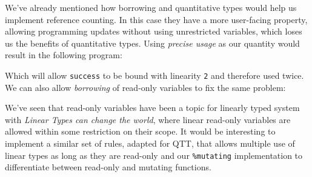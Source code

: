 \documentclass[
]{article}
\newenvironment{Shaded}{}{}
\newcommand{\CommentTok}[1]{\textcolor[rgb]{0.38,0.63,0.69}{\textit{#1}}}
\newcommand{\DataTypeTok}[1]{\textcolor[rgb]{0.56,0.13,0.00}{#1}}
\newcommand{\DecValTok}[1]{\textcolor[rgb]{0.25,0.63,0.44}{#1}}
\newcommand{\FunctionTok}[1]{\textcolor[rgb]{0.02,0.16,0.49}{#1}}
\newcommand{\KeywordTok}[1]{\textcolor[rgb]{0.00,0.44,0.13}{\textbf{#1}}}
\newcommand{\NormalTok}[1]{#1}
\newcommand{\OperatorTok}[1]{\textcolor[rgb]{0.40,0.40,0.40}{#1}}
\newcommand{\OtherTok}[1]{\textcolor[rgb]{0.00,0.44,0.13}{#1}}
\newcommand{\StringTok}[1]{\textcolor[rgb]{0.25,0.44,0.63}{#1}}
\begin{document}
We've already mentioned how borrowing and quantitative types would help
us implement reference counting. In this case they have a more
user-facing property, allowing programming updates without using
unrestricted variables, which loses us the benefits of quantitative
types. Using \emph{precise usage} as our quantity would result in the
following program:

\begin{Shaded}
\end{Shaded}

Which will allow \texttt{success} to be bound with linearity \texttt{2}
and therefore used twice. We can also allow \emph{borrowing} of
read-only variables to fix the same problem:

\begin{Shaded}
\end{Shaded}

We've seen that read-only variables have been a topic for linearly typed
system with \emph{Linear Types can change the
world}\cite{linear_types_update}, where linear read-only variables are
allowed within some restriction on their scope. It would be interesting
to implement a similar set of rules, adapted for QTT, that allows
multiple use of linear types as long as they are read-only and our
\texttt{\%mutating} implementation to differentiate between read-only
and mutating functions.
\end{document}
